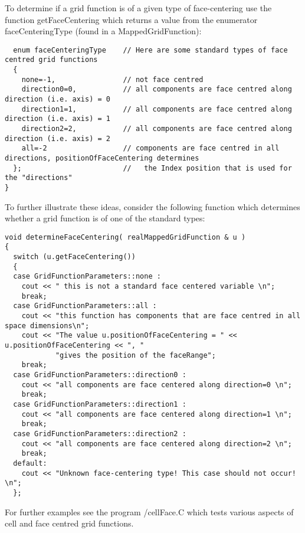 To determine if a grid function is of a given type of face-centering use the function
{\ff getFaceCentering} which returns a value from the enumerator {\ff faceCenteringType}
(found in a MappedGridFunction):
{\footnotesize\begin{verbatim}
  enum faceCenteringType    // Here are some standard types of face centred grid functions
  { 
    none=-1,                // not face centred
    direction0=0,           // all components are face centred along direction (i.e. axis) = 0
    direction1=1,           // all components are face centred along direction (i.e. axis) = 1
    direction2=2,           // all components are face centred along direction (i.e. axis) = 2
    all=-2                  // components are face centred in all directions, positionOfFaceCentering determines
  };                        //   the Index position that is used for the "directions"
}
\end{verbatim}
}

To further illustrate these ideas, consider
the following function which determines whether a grid function is of one of the
standard types:
{\footnotesize\begin{verbatim}
void determineFaceCentering( realMappedGridFunction & u )
{
  switch (u.getFaceCentering())
  {
  case GridFunctionParameters::none :
    cout << " this is not a standard face centered variable \n";
    break;
  case GridFunctionParameters::all :
    cout << "this function has components that are face centred in all space dimensions\n";
    cout << "The value u.positionOfFaceCentering = " << u.positionOfFaceCentering << ", "
            "gives the position of the faceRange";
    break;
  case GridFunctionParameters::direction0 :
    cout << "all components are face centered along direction=0 \n";
    break;
  case GridFunctionParameters::direction1 :
    cout << "all components are face centered along direction=1 \n";
    break;
  case GridFunctionParameters::direction2 :
    cout << "all components are face centered along direction=2 \n";
    break;
  default:
    cout << "Unknown face-centering type! This case should not occur! \n";
  };
\end{verbatim}
}
For further examples see the program {\ff \GF /cellFace.C} which tests
various aspects of cell and face centred grid functions.